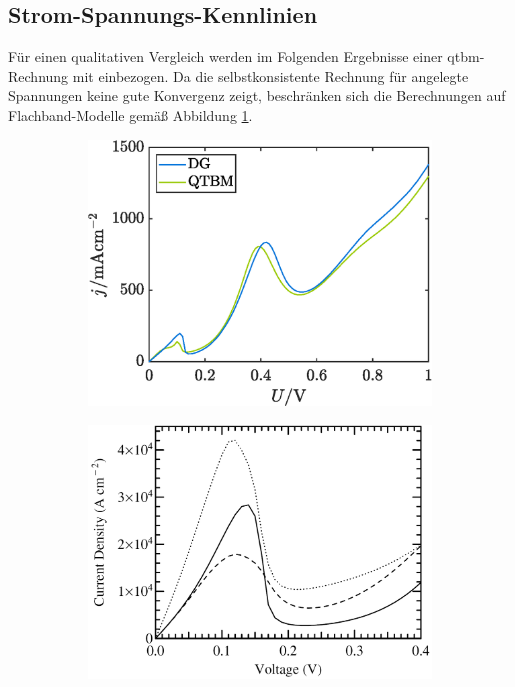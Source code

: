 \subsection{Strom-Spannungs-Kennlinien}
Für einen qualitativen Vergleich werden im Folgenden Ergebnisse einer \ac{qtbm}-Rechnung mit einbezogen. Da die selbstkonsistente Rechnung für angelegte Spannungen keine gute Konvergenz zeigt, beschränken sich die Berechnungen auf Flachband-Modelle gemäß Abbildung \ref{fig:iv1}.
\begin{figure}
    \centering
    \begin{subfigure}[b]{0.48\textwidth}
        \centering
        \includegraphics[width=\textwidth]{plots/IV/IV_qtbm_dg_grob.eps}
        \label{fig:iv1}
    \end{subfigure}
    \hfill
    \begin{subfigure}[b]{0.48\textwidth}
        \centering
        \includegraphics[width=\textwidth]{plots/IV/frensley.png}

\end{subfigure}
\end{figure}
